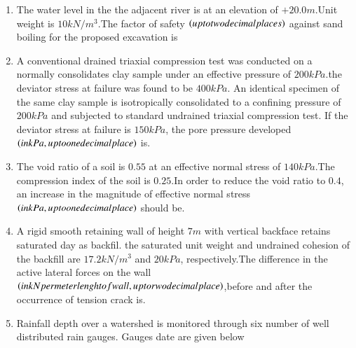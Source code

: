 \documentclass[journal,12pt,twocolumn]{IEEEtran}
\theoremstyle{remark}
\begin{document}
\begin{enumerate}
 \item The water level in the the adjacent river is at an elevation of $+20.0 m$.Unit weight is $10 kN/m^{3}$.The factor of safety $\left(up to two decimal places\right)$ against sand boiling for the proposed excavation is \\
\item A conventional drained triaxial compression test was conducted  on a normally consolidates clay sample under an effective pressure of $200 kPa$.the deviator stress at failure was found to be $400 kPa$. An identical specimen of the same clay sample is isotropically consolidated to a confining pressure of $200 kPa$ and subjected to standard undrained triaxial compression test. If the deviator stress at failure is $150 kPa$, the pore pressure developed $\left(in kPa, up to one decimal place\right) $ is.\\
\item The void ratio of a soil is $0.55$ at an effective normal stress of $140 kPa$.The compression index of the soil is $0.25$.In order to reduce the void ratio to $0.4$, an increase in the magnitude of effective normal stress $\left(in kPa,up to one decimal place\right)$ should be.\\
\item A rigid smooth retaining wall of height $7 m$ with vertical backface retains saturated day as backfil. the saturated unit weight and undrained cohesion of the backfill are $17.2 kN/m^{3}$ and $20 kPa$, respectively.The difference in the active lateral forces on the wall $\left(in kN per meter lenght of wall,up to rwo decimal place\right)$,before and after the occurrence of tension crack is.\\
\item Rainfall depth over a watershed is monitored through six number of well distributed rain gauges. Gauges date are given below\\


\end{enumerate}
\end{document}

